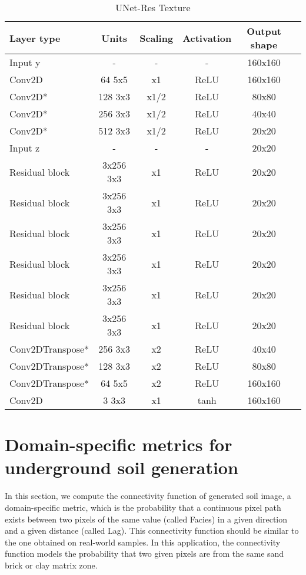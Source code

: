 \begin{table*}[!h]
	\centering
	\begin{tabular}{|l|c|c|c|c|c|}
		\hline
		Layer type & Units & Scaling & Activation & Output shape\\
		\hline
		Input y & - & - & - & 160x160\\
		Conv2D & 64 5x5 & x1 & ReLU & 160x160 \\
		Conv2D* & 128 3x3 & x1/2 & ReLU & 80x80 \\
		Conv2D* & 256 3x3 & x1/2 & ReLU & 40x40 \\
		Conv2D* & 512 3x3 & x1/2 & ReLU & 20x20 \\
		Input z & - & - & - & 20x20 \\
		Residual block & 3x256 3x3 & x1 & ReLU & 20x20 \\
		Residual block & 3x256 3x3 & x1 & ReLU & 20x20 \\
		Residual block & 3x256 3x3 & x1 & ReLU & 20x20 \\
		Residual block & 3x256 3x3 & x1 & ReLU & 20x20 \\
		Residual block & 3x256 3x3 & x1 & ReLU & 20x20 \\
		Residual block & 3x256 3x3 & x1 & ReLU & 20x20 \\
		Conv2DTranspose* & 256 3x3 & x2 & ReLU & 40x40 \\
		Conv2DTranspose* & 128 3x3 & x2 & ReLU & 80x80 \\
		Conv2DTranspose* & 64 5x5 & x2 & ReLU & 160x160 \\
		Conv2D & 3 3x3 & x1 & tanh & 160x160 \\
		\hline
	\end{tabular}
	\caption{UNet-Res Texture} 
\end{table*}
\noindent

\section{Domain-specific metrics for underground soil generation}
\label{app:geostatistics}

In this section, we compute the connectivity function \cite{Lemmens2017} of generated soil image, a domain-specific metric, which is the probability that a continuous pixel path exists between two pixels of the same value (called Facies) in a given direction and a given distance (called Lag). This connectivity function should be similar to the one obtained on real-world samples. In this application, the connectivity function models the probability that two given pixels are from the same sand brick or clay matrix zone.

